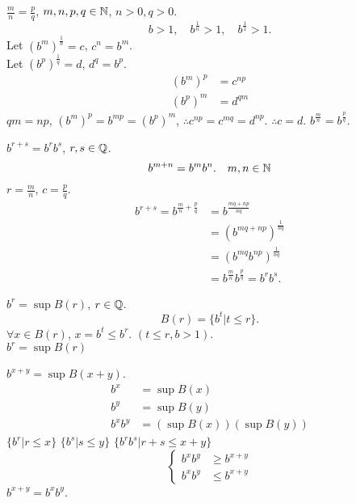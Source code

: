     \begin{asparaenum}[(a)]
        \item $\frac{m}{n} = \frac{p}{q}$, $m,n,p,q \in {\protect\mathbb N}$, $n>0,q>0$.
        \begin{equation*}
            b>1, \quad
            b^{\frac{1}{n}}>1, \quad
            b^{\frac{1}{1}}>1.
        \end{equation*}
        Let $(b^m)^{\frac{1}{n}} = c$, $c^n = b^m$.\\
        Let $(b^p)^{\frac{1}{q}} = d$, $d^q = b^p$.\\
        \begin{align*}
            (b^m)^p &= c^{np}\\
            (b^p)^m &= d^{qm}
        \end{align*}
        $qm = np$, $(b^m)^p = b^{mp} = (b^p)^m$,
        $\therefore c^{np} = c^{mq} = d^{np}$.
        $\therefore c = d$. $b^{\frac{m}{n}} = b^{\frac{p}{q}}$.
        \item $b^{r+s} = b^r b^s$, $r, s \in {\protect\mathbb Q}$.
        \begin{equation*}
            b^{m+n} = b^m b^n. 
            \quad m,n \in {\protect\mathbb N}
        \end{equation*}
        $r = \frac{m}{n}$, $c = \frac{p}{q}$.
        \begin{align*}
            b^{r+s} = b^{\frac{m}{n} + \frac{p}{q}}
            &= b^{\frac{mq+np}{nq}} \\
            &= \left( b^{mq+np} \right)^{\frac{1}{nq}} \\
            &= \left( b^{mq} b^{np} \right)^{\frac{1}{nq}} \\
            &= b^{\frac{m}{n}} b^{\frac{p}{q}}  = b^r b^s.
        \end{align*}
        \item $b^r = \sup B(r)$, $r \in {\protect\mathbb Q}$.
        \begin{equation*}
            B(r) = \{b^t | t \leq r\}.
        \end{equation*}
        $\forall x \in B(r)$, $x = b^t \leq b^r$. $(t \leq r, b > 1)$.\\
        $b^r = \sup B(r)$
        \item $b^{x+y} = \sup B(x+y)$.
        \begin{align*}
            b^x &= \sup B(x) \\
            b^y &= \sup B(y) \\
            b^x b^y &= \left( \sup B(x) \right) \left( \sup B(y) \right)
        \end{align*}
        $\{b^r| r\leq x\}$
        $\{b^s| s\leq y\}$
        $\{b^r b^s| r+s\leq x+y\}$
        \begin{equation*}
            \left\{ \begin{array}{ll}
                b^x b^y &\geq b^{x+y} \\
                b^x b^y &\leq b^{x+y}
            \end{array} \right.
        \end{equation*}
        $b^{x+y} = b^x b^y$.
        \item 
    \end{asparaenum}

